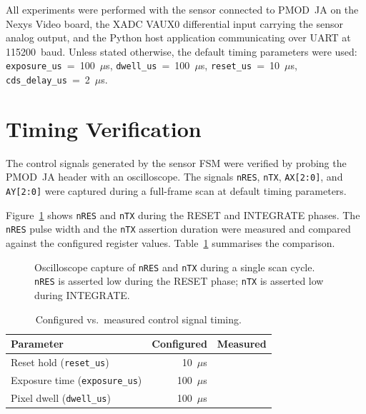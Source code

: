 
All experiments were performed with the sensor connected to PMOD~JA on the Nexys Video board, the XADC VAUX0 differential input carrying the sensor analog output, and the Python host application communicating over UART at 115200~baud. Unless stated otherwise, the default timing parameters were used: \texttt{exposure\_us}~=~100~$\mu$s, \texttt{dwell\_us}~=~100~$\mu$s, \texttt{reset\_us}~=~10~$\mu$s, \texttt{cds\_delay\_us}~=~2~$\mu$s.

\section{Timing Verification}

The control signals generated by the sensor FSM were verified by probing the PMOD~JA header with an oscilloscope. The signals \texttt{nRES}, \texttt{nTX}, \texttt{AX[2:0]}, and \texttt{AY[2:0]} were captured during a full-frame scan at default timing parameters.

Figure~\ref{fig:ctrl_signals} shows \texttt{nRES} and \texttt{nTX} during the RESET and INTEGRATE phases. The \texttt{nRES} pulse width and the \texttt{nTX} assertion duration were measured and compared against the configured register values. 
Table~\ref{tab:timing_measured} summarises the comparison.

\begin{figure}[h]
  \centering
  \caption{Oscilloscope capture of \texttt{nRES} and \texttt{nTX}
    during a single scan cycle. \texttt{nRES} is asserted low during
    the RESET phase; \texttt{nTX} is asserted low during INTEGRATE.}
  \label{fig:ctrl_signals}
\end{figure}

\begin{table}[h]
\centering
\caption{Configured vs.\ measured control signal timing.}
\label{tab:timing_measured}
\begin{tabular}{lrr}
\hline
\textbf{Parameter} & \textbf{Configured} & \textbf{Measured} \\
\hline
Reset hold (\texttt{reset\_us}) & 10~$\mu$s  & \\ %
Exposure time (\texttt{exposure\_us}) & 100~$\mu$s & \\ %
Pixel dwell (\texttt{dwell\_us}) & 100~$\mu$s & \\ %
\hline
\end{tabular}
\end{table}